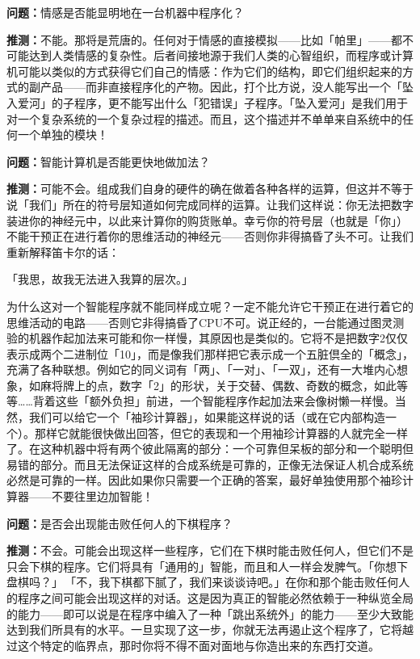 \documentclass[
  12pt,
  twoside,
  openright,
  oldfontcommands,
]{memoir}
\newcommand{\dialogname}[1]{{\heifamily\bfseries #1}}
\begin{document}
\dialogname{问题：}情感是否能显明地在一台机器中程序化？

\dialogname{推测：}不能。那将是荒唐的。任何对于情感的直接模拟------比如「帕里」------都不可能达到人类情感的复杂性。后者间接地源于我们人类的心智组织，而程序或计算机可能以类似的方式获得它们自己的情感：作为它们的结构，即它们组织起来的方式的副产品------而非直接程序化的产物。因此，打个比方说，没人能写出一个「坠入爱河」的子程序，更不能写出什么「犯错误」子程序。「坠入爱河」是我们用于对一个复杂系统的一个复杂过程的描述。而且，这个描述并不单单来自系统中的任何一个单独的模块！

\dialogname{问题：}智能计算机是否能更快地做加法？

\dialogname{推测：}可能不会。组成我们自身的硬件的确在做着各种各样的运算，但这并不等于说「我们」所在的符号层知道如何完成同样的运算。让我们这样说：你无法把数字装进你的神经元中，以此来计算你的购货账单。幸亏你的符号层（也就是「你」）不能干预正在进行着你的思维活动的神经元------否则你非得搞昏了头不可。让我们重新解释笛卡尔的话：

「我思，故我无法进入我算的层次。」

为什么这对一个智能程序就不能同样成立呢？一定不能允许它干预正在进行着它的思维活动的电路------否则它非得搞昏了CPU不可。说正经的，一台能通过图灵测验的机器作起加法来可能和你一样慢，其原因也是类似的。它将不是把数字2仅仅表示成两个二进制位「10」，而是像我们那样把它表示成一个五脏倶全的「概念」，充满了各种联想。例如它的同义词有「两」、「一对」、「一双」，还有一大堆内心想象，如麻将牌上的点，数字「2」的形状，关于交替、偶数、奇数的概念，如此等等\ldots\ldots 背着这些「额外负担」前进，一个智能程序作起加法来会像树懒一样慢。当然，我们可以给它一个「袖珍计算器」，如果能这样说的话（或在它内部构造一个）。那样它就能很快做出回答，但它的表现和一个用袖珍计算器的人就完全一样了。在这种机器中将有两个彼此隔离的部分：一个可靠但呆板的部分和一个聪明但易错的部分。而且无法保证这样的合成系统是可靠的，正像无法保证人机合成系统必然是可靠的一样。因此如果你只需要一个正确的答案，最好单独使用那个袖珍计算器------不要往里边加智能！

\dialogname{问题：}是否会出现能击败任何人的下棋程序？

\dialogname{推测：}不会。可能会出现这样一些程序，它们在下棋时能击败任何人，但它们不是只会下棋的程序。它们将具有「通用的」智能，而且和人一样会发脾气。「你想下盘棋吗？」\,「不，我下棋都下腻了，我们来谈谈诗吧。」在你和那个能击败任何人的程序之间可能会出现这样的对话。这是因为真正的智能必然依赖于一种纵览全局的能力------即可以说是在程序中编入了一种「跳出系统外」的能力------至少大致能达到我们所具有的水平。一旦实现了这一步，你就无法再遏止这个程序了，它将越过这个特定的临界点，那时你将不得不面对面地与你造出来的东西打交道。
\end{document}
